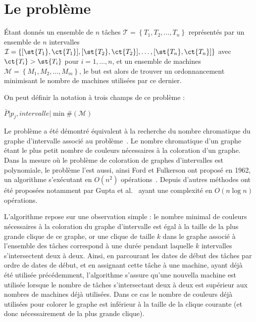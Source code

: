 \documentclass[a4paper,11pt]{report}
\begin{document}
\section{Le problème \bisched{}}

Étant donnés un ensemble de $n$ tâches $\mathcal{T} = \left\{
T_1, T_2, \dots, T_n \right\}$ représentés par un ensemble de $n$ intervalles $\mathcal{I} = \{
[ \st{T_1}, \ct{T_1} ], [ \st{T_2}, \ct{T_2} ], \dots, [ \st{T_n},
\ct{T_n} ] \}$ avec $\ct{T_i} > \st{T_i}$ pour $i = 1, \dots, n$, et un ensemble de
machines $\mathcal{M} = \left\{ M_1, M_2, \dots, M_m \right\}$, le but est alors de trouver un
ordonnancement minimisant le nombre de machines utilisées par ce dernier.

On peut définir la notation à trois champs de ce problème :
\begin{center}
    $\bar{P} \Big| p_j, intervalle \Big| \min \#(\mathcal{M})$
\end{center}

Le problème \bisched{} a été démontré équivalent à la recherche du nombre chromatique du graphe d'intervalle
associé au problème~\cite{golumbicalgorithmic}. Le nombre chromatique d'un graphe étant le plus
petit nombre de couleurs nécessaires à la coloration d'un graphe. Dans la mesure où le problème de
coloration de graphes d'intervalles est polynomiale, le problème \bisched{} l'est aussi, ainsi Ford et
Fulkerson ont proposé en 1962, un algorithme s'exécutant en $O(n^2)$
opérations~\cite{ford1962network}. Depuis d'autres méthodes ont été proposées notamment par Gupta et
al.~\cite{gupta_optimal_1978} ayant une complexité en $O(n\log n)$ opérations.

L'algorithme repose sur une observation simple : le nombre minimal de couleurs nécessaires à la
coloration du graphe d'intervalle est égal à la taille de la plus grande clique de ce graphe, or une
clique de taille $k$ dans le graphe associé à l'ensemble des tâches correspond à une durée pendant
laquelle $k$ intervalles s'intersectent deux à deux. Ainsi, en parcourant les dates de début des tâches par
ordre de dates de début, et en assignant cette tâche à une machine, ayant déjà été utilisée
précédemment, l'algorithme s'assure qu'une nouvella machine est utilisée lorsque le nombre de
tâches s'intersectant deux à deux est supérieur aux nombres de machines déjà utilisées. Dans ce cas
le nombre de couleurs déjà utilisées pour colorer le graphe est inférieur à la taille de la clique
courante (et donc nécessairement de la plus grande clique).
\end{document}
